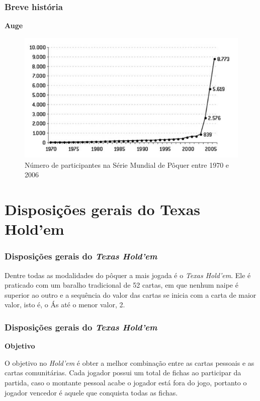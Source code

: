 \documentclass{beamer}
\begin{document}
\begin{frame}
\frametitle{Breve história}
\begin{center}
{\Large \textbf{Auge}}
\end{center}
\begin{figure}[!h]
	\centering
	\includegraphics[scale=.5]{grafico}
	\caption{Número de participantes na Série Mundial de Pôquer entre 1970 e 2006}
\end{figure}

\end{frame}	

\section{Disposições gerais do Texas Hold'em}
\begin{frame}
\frametitle{Disposições gerais do \textit{Texas Hold'em}} 
Dentre todas as modalidades do pôquer a mais jogada é o \textit{Texas Hold'em}. Ele é praticado com um baralho tradicional de 52 cartas, em que nenhum naipe é superior ao outro e a sequência do valor das cartas se inicia com a carta de maior valor, isto é, o Ás até o menor valor, 2.

\end{frame}

\begin{frame}
\frametitle{Disposições gerais do \textit{Texas Hold'em}} 
\begin{center}
{\Large \textbf{Objetivo}}
\end{center}
O objetivo no \textit{Hold'em} é obter a melhor combinação entre as cartas pessoais e as cartas comunitárias. Cada jogador possui um total de fichas ao participar da partida, caso o montante pessoal acabe o jogador está fora do jogo, portanto o jogador vencedor é aquele que conquista todas as fichas.	

\end{frame}
\end{document}
